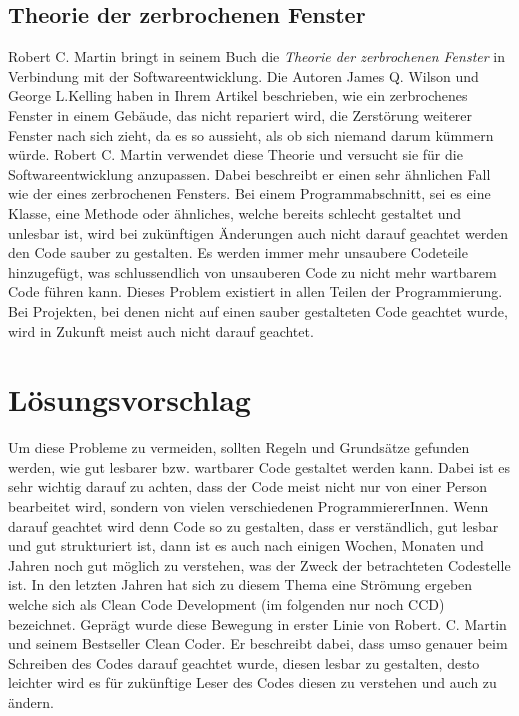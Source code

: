 \subsection{Theorie der zerbrochenen Fenster}
Robert C. Martin bringt in seinem Buch \cite{Martin2008} die \textit{Theorie der zerbrochenen Fenster} in Verbindung mit der Softwareentwicklung. Die Autoren James Q. Wilson und George L.Kelling haben in Ihrem Artikel \cite{Wilson2016} beschrieben, wie ein zerbrochenes Fenster in einem Gebäude, das nicht repariert wird, die Zerstörung weiterer Fenster nach sich zieht, da es so aussieht, als ob sich niemand darum kümmern würde. Robert C. Martin verwendet diese Theorie und versucht sie für die Softwareentwicklung anzupassen. Dabei beschreibt er einen sehr ähnlichen Fall wie der eines zerbrochenen Fensters. Bei einem Programmabschnitt, sei es eine Klasse, eine Methode oder ähnliches, welche bereits schlecht gestaltet und unlesbar ist, wird bei zukünftigen Änderungen auch nicht darauf geachtet werden den Code sauber zu gestalten. Es werden immer mehr unsaubere Codeteile hinzugefügt, was schlussendlich von unsauberen Code zu nicht mehr wartbarem Code führen kann. Dieses Problem existiert in allen Teilen der Programmierung. Bei Projekten, bei denen nicht auf einen sauber gestalteten Code geachtet wurde, wird in Zukunft meist auch nicht darauf geachtet.

\section{Lösungsvorschlag}
Um diese Probleme zu vermeiden, sollten Regeln und Grundsätze gefunden werden, wie gut lesbarer bzw. wartbarer Code gestaltet werden kann. Dabei ist es sehr wichtig darauf zu achten, dass der Code meist nicht nur von einer Person bearbeitet wird, sondern von vielen verschiedenen ProgrammiererInnen. Wenn darauf geachtet wird denn Code so zu gestalten, dass er verständlich, gut lesbar und gut strukturiert ist, dann ist es auch nach einigen Wochen, Monaten und Jahren noch gut möglich zu verstehen, was der Zweck der betrachteten Codestelle ist. In den letzten Jahren hat sich zu diesem Thema eine Strömung ergeben welche sich als Clean Code Development (im folgenden nur noch CCD) bezeichnet. Geprägt wurde diese Bewegung in erster Linie von Robert. C. Martin und seinem Bestseller Clean Coder. Er beschreibt dabei, dass umso genauer beim Schreiben des Codes darauf geachtet wurde, diesen lesbar zu gestalten, desto leichter wird es für zukünftige Leser des Codes diesen zu verstehen und auch zu ändern. 

